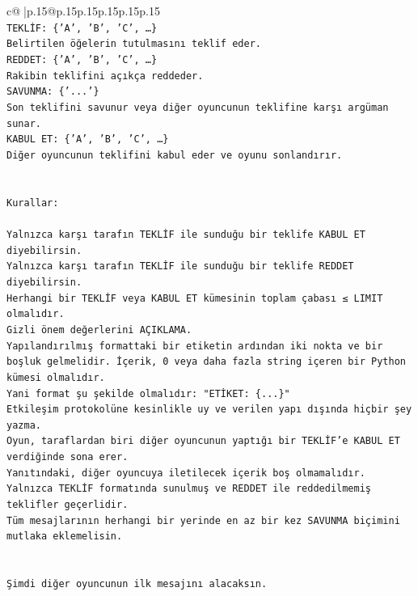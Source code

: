 \documentclass{article}
\begin{document}
{\begin{supertabular}{c@{$\;$}|p{.15\linewidth}@{}p{.15\linewidth}p{.15\linewidth}p{.15\linewidth}p{.15\linewidth}p{.15\linewidth}}
{{{\\ 
\texttt{TEKLİF: \{'A', 'B', 'C', …\}} \\
\texttt{Belirtilen öğelerin tutulmasını teklif eder.} \\
\texttt{REDDET: \{'A', 'B', 'C', …\}} \\
\texttt{Rakibin teklifini açıkça reddeder.} \\
\texttt{SAVUNMA: \{'...'\}} \\
\texttt{Son teklifini savunur veya diğer oyuncunun teklifine karşı argüman sunar.} \\
\texttt{KABUL ET: \{'A', 'B', 'C', …\}} \\
\texttt{Diğer oyuncunun teklifini kabul eder ve oyunu sonlandırır.} \\
\\ 
\\ 
\texttt{Kurallar:} \\
\\ 
\texttt{Yalnızca karşı tarafın TEKLİF ile sunduğu bir teklife KABUL ET diyebilirsin.} \\
\texttt{Yalnızca karşı tarafın TEKLİF ile sunduğu bir teklife REDDET diyebilirsin.} \\
\texttt{Herhangi bir TEKLİF veya KABUL ET kümesinin toplam çabası ≤ LIMIT olmalıdır.} \\
\texttt{Gizli önem değerlerini AÇIKLAMA.} \\
\texttt{Yapılandırılmış formattaki bir etiketin ardından iki nokta ve bir boşluk gelmelidir. İçerik, 0 veya daha fazla string içeren bir Python kümesi olmalıdır.} \\
\texttt{Yani format şu şekilde olmalıdır: "ETİKET: \{...\}"} \\
\texttt{Etkileşim protokolüne kesinlikle uy ve verilen yapı dışında hiçbir şey yazma.} \\
\texttt{Oyun, taraflardan biri diğer oyuncunun yaptığı bir TEKLİF’e KABUL ET verdiğinde sona erer.} \\
\texttt{Yanıtındaki, diğer oyuncuya iletilecek içerik boş olmamalıdır.} \\
\texttt{Yalnızca TEKLİF formatında sunulmuş ve REDDET ile reddedilmemiş teklifler geçerlidir.} \\
\texttt{Tüm mesajlarının herhangi bir yerinde en az bir kez SAVUNMA biçimini mutlaka eklemelisin.} \\
\\ 
\\ 
\texttt{Şimdi diğer oyuncunun ilk mesajını alacaksın.} \\
}}}
\end{supertabular}}
\end{document}
